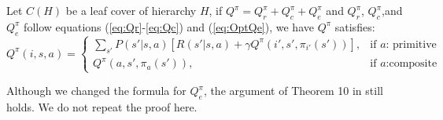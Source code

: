 \begin{theorem}
    Let $C(H)$ be a leaf cover of hierarchy $H$, if $Q^{\pi} = Q_r^{\pi} + Q_c^{\pi} + Q_e^{\pi}$ and
    $Q_r^{\pi}$, $Q_c^{\pi}$,and $Q_e^{\pi}$ follow equations (\ref{eq:Qr}-\ref{eq:Qc}) and (\ref{eq:OptQe}), we have $Q^{\pi}$ satisfies:
    \begin{equation*}
    Q^{\pi}(i, s, a) = 
    \left\{\begin{array}{ll}
        \sum_{s'}P(s'|s, a)[R(s'|s, a) + \gamma Q^{\pi}(i', s', \pi_{i'}(s'))], &\mbox{if $a$: primitive} \\
        Q^{\pi}(a, s', \pi_{a}(s')), &\mbox{if $a$:composite}
    \end{array} \right.
    \end{equation*}
    \label{thm:Bell}
\end{theorem}
Although we changed the formula for $Q_e^{\pi}$, the argument of Theorem 10 in \cite{HORDQ} still holds.
We do not repeat the proof here. 



